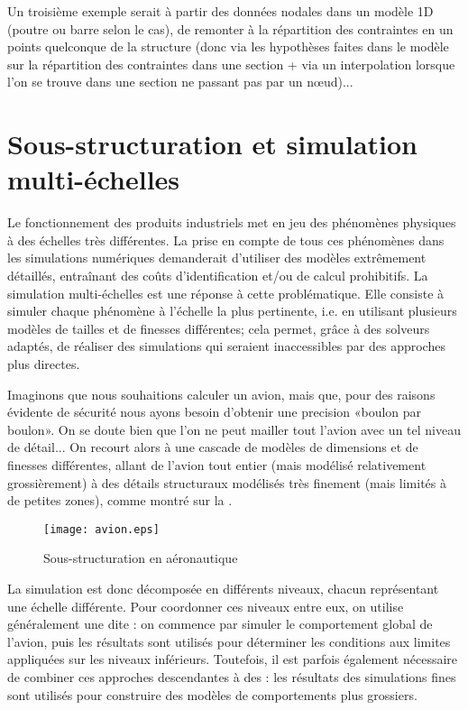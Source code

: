\medskip
Un troisième exemple serait à partir des données nodales dans un modèle 1D
(poutre ou barre selon le cas), de remonter à la répartition des contraintes en un
points quelconque de la structure (donc via les hypothèses faites dans le modèle
sur la répartition des contraintes dans une section + via un interpolation lorsque l'on se
trouve dans une section ne passant pas par un nœud)...



\medskip
\section{Sous-structuration et simulation multi-échelles}\label{Sec-ssstruc}

Le fonctionnement des produits industriels met en jeu des phénomènes physiques à des
échelles très différentes.
La prise en compte de tous ces phénomènes dans les simulations numériques demanderait
d'utiliser des modèles extrêmement détaillés, entraînant des coûts d'identification
et/ou de calcul prohibitifs.
La simulation multi-échelles est une réponse à cette problématique.
Elle consiste à simuler chaque phénomène à l'échelle la plus pertinente,
i.e. en utilisant plusieurs modèles de tailles et de finesses différentes; cela permet,
grâce à des solveurs adaptés, de réaliser des simulations qui seraient inaccessibles
par des approches plus directes.

\medskip
Imaginons que nous souhaitions calculer un avion, mais que, pour des raisons
évidente de sécurité nous ayons besoin d'obtenir une precision «boulon par boulon».
On se doute bien que l'on ne peut mailler tout l'avion avec un tel niveau de détail...
On recourt alors à une cascade de modèles de dimensions et de finesses différentes,
allant de l'avion tout entier (mais modélisé relativement grossièrement) à
des détails structuraux modélisés très finement (mais limités à de petites zones), comme
montré sur la .
\begin{figure}[ht]
\centering\texttt{[image: avion.eps]}
\caption{Sous-structuration en aéronautique}\label{Fig-avion}
\end{figure}

La simulation est donc décomposée en différents niveaux, chacun représentant une échelle
différente. Pour coordonner ces niveaux entre eux, on utilise généralement une
 dite :
on commence par simuler le comportement global de l'avion, puis les résultats sont utilisés pour
déterminer les conditions aux limites appliquées sur les niveaux inférieurs.
Toutefois, il est parfois également nécessaire de combiner ces approches descendantes
à des :
les résultats des simulations fines sont utilisés pour construire des modèles de comportements
plus grossiers.


